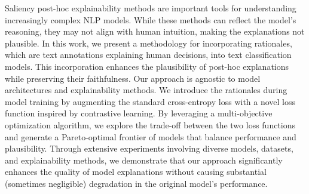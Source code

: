 Saliency post-hoc explainability methods are important tools for understanding increasingly complex NLP models. While these methods can reflect the model's reasoning, they may not align with human intuition, making the explanations not plausible. In this work, we present a methodology for incorporating rationales, which are text annotations explaining human decisions, into text classification models. This incorporation enhances the plausibility of post-hoc explanations while preserving their faithfulness. Our approach is agnostic to model architectures and explainability methods. We introduce the rationales during model training by augmenting the standard cross-entropy loss with a novel loss function inspired by contrastive learning. By leveraging a multi-objective optimization algorithm, we explore the trade-off between the two loss functions and generate a Pareto-optimal frontier of models that balance performance and plausibility. Through extensive experiments involving diverse models, datasets, and explainability methods, we demonstrate that our approach significantly enhances the quality of model explanations without causing substantial (sometimes negligible) degradation in the original model's performance.